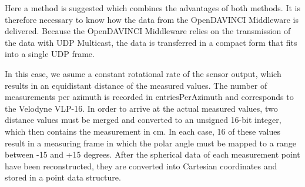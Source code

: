 \documentclass[11pt,oneside,openright]{mpreport}
\begin{document}
Here a method is suggested which combines the advantages of both methods. It is therefore necessary to know how the data from the OpenDAVINCI
Middleware is delivered. Because the OpenDAVINCI Middleware relies on the transmission of the data with UDP Multicast, the data is transferred in a 
compact form that fits into a single UDP frame.\\
\begin{center}
\end{center}
In this case, we asume a constant rotational rate of the sensor output, which results in an equidistant distance of the measured values. The number of measurements per azimuth is recorded in 
entriesPerAzimuth and corresponds to the Velodyne VLP-16. In order to arrive at the actual measured values, two distance values must be merged and converted to an unsigned 16-bit integer,
which then contains the measurement in cm. In each case, 16 of these values result in a measuring frame in which the polar angle must be mapped to a range between -15 and +15 degrees.
After the spherical data of each measurement point have been reconstructed, they are converted into Cartesian coordinates and stored in a point data structure.
\end{document}
